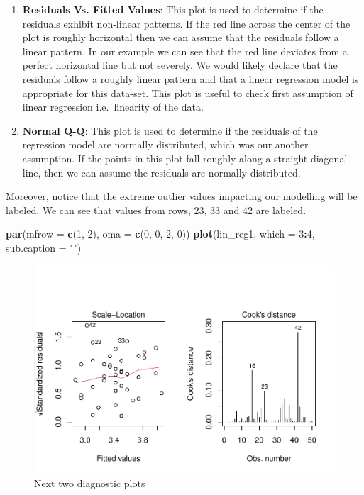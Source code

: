 \documentclass[
]{book}
\newenvironment{Shaded}{\begin{snugshade}}{\end{snugshade}}
\newcommand{\AttributeTok}[1]{\textcolor[rgb]{0.13,0.29,0.53}{#1}}
\newcommand{\DecValTok}[1]{\textcolor[rgb]{0.00,0.00,0.81}{#1}}
\newcommand{\FunctionTok}[1]{\textcolor[rgb]{0.13,0.29,0.53}{\textbf{#1}}}
\newcommand{\NormalTok}[1]{#1}
\newcommand{\SpecialCharTok}[1]{\textcolor[rgb]{0.81,0.36,0.00}{\textbf{#1}}}
\newcommand{\StringTok}[1]{\textcolor[rgb]{0.31,0.60,0.02}{#1}}
\providecommand{\tightlist}{%
  \setlength{\itemsep}{0pt}\setlength{\parskip}{0pt}}
\begin{document}
\begin{enumerate}
\def\labelenumi{\arabic{enumi}.}
\tightlist
\item
  \textbf{Residuals Vs. Fitted Values}: This plot is used to determine if the residuals exhibit non-linear patterns. If the red line across the center of the plot is roughly horizontal then we can assume that the residuals follow a linear pattern. In our example we can see that the red line deviates from a perfect horizontal line but not severely. We would likely declare that the residuals follow a roughly linear pattern and that a linear regression model is appropriate for this data-set. This plot is useful to check first assumption of linear regression i.e.~linearity of the data.
\item
  \textbf{Normal Q-Q}: This plot is used to determine if the residuals of the regression model are normally distributed, which was our another assumption. If the points in this plot fall roughly along a straight diagonal line, then we can assume the residuals are normally distributed.
\end{enumerate}

Moreover, notice that the extreme outlier values impacting our modelling will be labeled. We can see that values from rows, 23, 33 and 42 are labeled.

\begin{Shaded}
\begin{Highlighting}[]
\FunctionTok{par}\NormalTok{(}\AttributeTok{mfrow =} \FunctionTok{c}\NormalTok{(}\DecValTok{1}\NormalTok{, }\DecValTok{2}\NormalTok{), }\AttributeTok{oma =} \FunctionTok{c}\NormalTok{(}\DecValTok{0}\NormalTok{, }\DecValTok{0}\NormalTok{, }\DecValTok{2}\NormalTok{, }\DecValTok{0}\NormalTok{))}
\FunctionTok{plot}\NormalTok{(lin\_reg1, }\AttributeTok{which =} \DecValTok{3}\SpecialCharTok{:}\DecValTok{4}\NormalTok{, }\AttributeTok{sub.caption =} \StringTok{""}\NormalTok{)}
\end{Highlighting}
\end{Shaded}

\begin{figure}

{\centering \includegraphics[height=0.4\textheight]{DauR_files/figure-latex/plots2-1} 

}

\caption{Next two diagnostic plots}\label{fig:plots2}
\end{figure}
\end{document}
